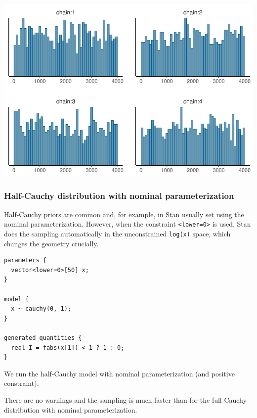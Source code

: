 \documentclass[american,]{article}
\begin{document}
\includegraphics{graphics/hist-fit-alt3-lp-1.pdf}

\hypertarget{half-cauchy-distribution-with-nominal-parameterization}{%
\subsubsection*{Half-Cauchy distribution with nominal
parameterization}\label{half-cauchy-distribution-with-nominal-parameterization}}

Half-Cauchy priors are common and, for example, in Stan usually set
using the nominal parameterization. However, when the constraint
\texttt{\textless{}lower=0\textgreater{}} is used, Stan does the
sampling automatically in the unconstrained \texttt{log(x)} space, which
changes the geometry crucially.

\begin{verbatim}
parameters {
  vector<lower=0>[50] x;
}

model {
  x ~ cauchy(0, 1);
}

generated quantities {
  real I = fabs(x[1]) < 1 ? 1 : 0;
}
\end{verbatim}

We run the half-Cauchy model with nominal parameterization (and positive
constraint).

There are no warnings and the sampling is much faster than for the full
Cauchy distribution with nominal parameterization.
\end{document}
